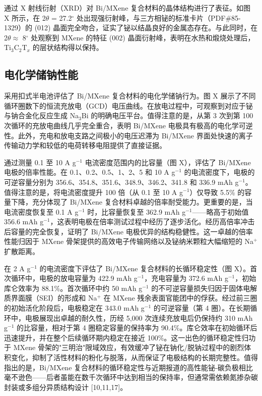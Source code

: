 通过 X 射线衍射（XRD）对 Bi/MXene 复合材料的晶体结构进行了表征。如图 X 所示，在 2$\theta$ = 27.2$^{\circ}$ 处出现强衍射峰，与三方相铋的标准卡片（PDF\#85-1329）的 (012) 晶面完全吻合，证实了铋以结晶良好的金属态存在。与此同时，在 2$\theta \approx$ 8$^{\circ}$ 处观察到 MXene 的特征 (002) 晶面衍射峰，表明在水热和煅烧处理后，Ti$_{3}$C$_{2}$T$_{x}$ 的层状结构得以保持。

\subsection{电化学储钠性能}

采用扣式半电池评估了 Bi/MXene 复合材料的电化学储钠行为。图 X 展示了不同循环圈数下的恒流充放电（GCD）电压曲线。在放电过程中，可观察到对应于铋与钠合金化反应生成 Na$_{3}$Bi 的明确电压平台。值得注意的是，从第 3 次到第 100 次循环的充放电曲线几乎完全重合，表明 Bi/MXene 电极具有极高的电化学可逆性。此外，充电和放电支路之间极小的电压迟滞为 Bi/MXene 界面处快速的离子传输动力学和较低的电荷转移电阻提供了直接证据。

通过测量 0.1 至 10 A g$^{-1}$ 电流密度范围内的比容量（图 X），评估了 Bi/MXene 电极的倍率性能。在 0.1、0.2、0.5、1、2、5 和 10 A g$^{-1}$ 的电流密度下，电极的可逆容量分别为 356.6、354.8、351.6、348.9、346.2、341.8 和 336.9 mAh g$^{-1}$。值得注意的是，将电流密度提升 100 倍（从 0.1 至 10 A g$^{-1}$）仅导致 5.5\% 的容量下降，充分体现了 Bi/MXene 复合材料卓越的倍率耐受能力。更重要的是，当电流密度恢复至 0.1 A g$^{-1}$ 时，比容量恢复至 362.9 mAh g$^{-1}$——略高于初始值 356.6 mAh g$^{-1}$，这表明电极在倍率测试过程中经历了逐步活化。经历高倍率冲击后容量的完全恢复，证明了 Bi/MXene 电极优异的结构稳健性。这一卓越的倍率性能归因于 MXene 骨架提供的高效电子传输网络以及铋纳米颗粒大幅缩短的 Na$^{+}$ 扩散距离。

在 2 A g$^{-1}$ 的电流密度下评估了 Bi/MXene 复合材料的长循环稳定性（图 X）。首次循环中，电极的放电容量为 422.9 mAh g$^{-1}$，充电容量为 372.6 mAh g$^{-1}$，初始库仑效率为 88.1\%。首次循环中约 50 mAh g$^{-1}$ 的不可逆容量损失归因于固体电解质界面膜（SEI）的形成和 Na$^{+}$ 在 MXene 残余表面官能团中的俘获。经过前三圈的初始活化阶段后，电极稳定在 343.0 mAh g$^{-1}$ 的可逆容量（第 4 圈）。在长期循环中，电极展现出卓越的耐久性，历经 5,000 次连续充放电后仍保持约 310 mAh g$^{-1}$ 的比容量，相对于第 4 圈稳定容量的保持率为 90.4\%。库仑效率在初始循环后迅速提升，并在整个后续循环期内稳定在接近 100\%。这一出色的循环稳定性归功于 MXene 骨架的"三明治"限域效应，有效缓冲了铋在钠化/脱钠过程中的剧烈体积变化，抑制了活性材料的粉化与脱落，从而保证了电极结构的长期完整性。值得指出的是，Bi/MXene 复合材料的循环稳定性与近期报道的高性能铋-碳负极相比毫不逊色——后者虽能在数千次循环中达到相当的保持率，但通常需依赖氮掺杂碳封装或多组分异质结构设计 [10,11,17]。

